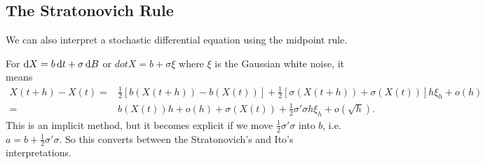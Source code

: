\subsection{The Stratonovich Rule}

We can also interpret a stochastic differential equation using the midpoint rule.

For $\dif X = b \dif t + \sigma \dif B$ or $dot{X} = b + \sigma \xi$ where $\xi$ is the Gaussian white noise, it means 
\begin{align*}
    X(t+h) - X(t) = & \frac{1}{2} \left[ b(X(t+h)) - b(X(t)) \right] + \frac{1}{2} \left[ \sigma(X(t+h)) + \sigma(X(t)) \right] h \xi_h + o(h) \\ 
    = & b(X(t)) h + o(h) + \sigma(X(t)) + \frac{1}{2} \sigma'\sigma h\xi_h + o(\sqrt{h}).
\end{align*}
This is an implicit method, but it becomes explicit if we move $\frac{1}{2} \sigma'\sigma$ into $b$, i.e. $a = b + \frac{1}{2} \sigma' \sigma$. So this converts between the Stratonovich's and Ito's interpretations.